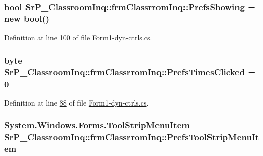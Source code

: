 \hypertarget{class_sr_p___classroom_inq_1_1frm_classrrom_inq_a915bf1ba42b54c697d1d90043610385f}{
\subsubsection[{\-Prefs\-Showing}]{\setlength{\rightskip}{0pt plus 5cm}bool {\bf \-Sr\-P\-\_\-\-Classroom\-Inq\-::frm\-Classrrom\-Inq\-::\-Prefs\-Showing} = new bool()}}
\label{class_sr_p___classroom_inq_1_1frm_classrrom_inq_a915bf1ba42b54c697d1d90043610385f}


\-Definition at line \hyperlink{_form1-dyn-ctrls_8cs_source_l00100}{100} of file \hyperlink{_form1-dyn-ctrls_8cs_source}{\-Form1-\/dyn-\/ctrls.\-cs}.

\hypertarget{class_sr_p___classroom_inq_1_1frm_classrrom_inq_a649306fdbca853561ee4a6cac829315a}{
\subsubsection[{\-Prefs\-Times\-Clicked}]{\setlength{\rightskip}{0pt plus 5cm}byte {\bf \-Sr\-P\-\_\-\-Classroom\-Inq\-::frm\-Classrrom\-Inq\-::\-Prefs\-Times\-Clicked} = 0}}
\label{class_sr_p___classroom_inq_1_1frm_classrrom_inq_a649306fdbca853561ee4a6cac829315a}


\-Definition at line \hyperlink{_form1-dyn-ctrls_8cs_source_l00088}{88} of file \hyperlink{_form1-dyn-ctrls_8cs_source}{\-Form1-\/dyn-\/ctrls.\-cs}.

\hypertarget{class_sr_p___classroom_inq_1_1frm_classrrom_inq_ab36e4efbf8b003fc5007cc6522901c21}{
\subsubsection[{\-Prefs\-Tool\-Strip\-Menu\-Item}]{\setlength{\rightskip}{0pt plus 5cm}\-System.\-Windows.\-Forms.\-Tool\-Strip\-Menu\-Item {\bf \-Sr\-P\-\_\-\-Classroom\-Inq\-::frm\-Classrrom\-Inq\-::\-Prefs\-Tool\-Strip\-Menu\-Item}}}
\label{class_sr_p___classroom_inq_1_1frm_classrrom_inq_ab36e4efbf8b003fc5007cc6522901c21}


